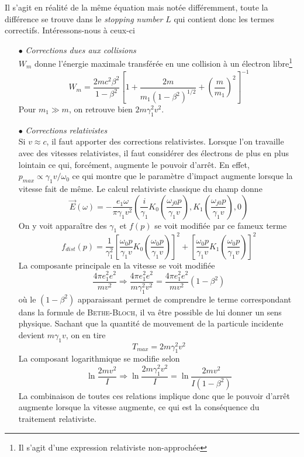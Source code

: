 Il s'agit en réalité de la même équation mais notée différemment, toute la différence se 
trouve dans le \textit{stopping number} $L$ qui contient donc les termes correctifs. 
Intéressons-nous à ceux-ci
\begin{itemize}
\item[$\bullet$] \textit{Corrections dues aux collisions}\ \\
$W_m$ donne l'énergie maximale transférée en une collision à un électron
libre\footnote{Il s'agit d'une expression relativiste non-approchée}
\begin{equation}
W_m=\frac{2mc^2\beta^2}{1-\beta^2}\left[1+\frac{2m}{m_1(1-\beta^2)^{1/2}}+\left(\frac{m}{m_1}\right)^2\right]^{-1}
\end{equation}
Pour $m_1\gg m$, on retrouve bien $2m\gamma_1^2v^2$.
\item[$\bullet$] \textit{Corrections relativistes}\ \\
Si $v\approx c$, il faut apporter des corrections relativistes. Lorsque l'on travaille avec
des vitesses relativistes, il faut considérer des électrons de plus en plus lointain ce qui, 
forcément, augmente le pouvoir d'arrêt. En effet, $p_{max} \propto \gamma_1v/\omega_0$ ce qui
montre que le paramètre d'impact augmente lorsque la vitesse fait de même. Le calcul relativiste
classique du champ donne
\begin{equation}
\overrightarrow{E}(\omega)=-\frac{e_1\omega}{\pi \gamma_1v^2}\left(\frac{i}{\gamma_1}K_0\left(\frac{\omega_{j0}p}{\gamma_1v}\right),K_1\left(\frac{\omega_{j0}p}{\gamma_1v}\right),0\right)
\end{equation}
On y voit apparaître des $\gamma_1$ et $f(p)$ se voit modifiée par ce fameux terme
\begin{equation}
f_{dist}(p)=\frac{1}{\gamma_1^2}\left[\frac{\omega_{0}p}{\gamma_1v}K_0\left(\frac{\omega_{0}p}{\gamma_1v}\right)\right]^2+\left[\frac{\omega_{0}p}{\gamma_1v}K_1\left(\frac{\omega_{0}p}{\gamma_1v}\right)\right]^2
\end{equation}
La composante principale en la vitesse se voit modifiée
\begin{equation}
\frac{4\pi e_1^2e^2}{mv^2}\Rightarrow \frac{4\pi e_1^2e^2}{m\gamma_1^2v^2}=\frac{4\pi e_1^2e^2}{mv^2}(1-\beta^2)
\end{equation}
où le $(1-\beta^2)$ apparaissant permet de comprendre le terme correspondant dans la formule de 
\textsc{Bethe-Bloch}, il va être possible de lui donner un sens physique. Sachant que la quantité 
de mouvement de la particule incidente devient $m\gamma_1v$, on en tire
\begin{equation}
T_{max}=2m\gamma_1^2v^2
\end{equation}
La composant logarithmique se modifie selon
\begin{equation}
\ln{\frac{2mv^2}{I}}\Rightarrow \ln{\frac{2m\gamma_1^2v^2}{I}}=\ln{\frac{2mv^2}{I(1-\beta^2)}}
\end{equation}
La combinaison de toutes ces relations implique donc que le pouvoir d'arrêt augmente lorsque 
la vitesse augmente, ce qui est la conséquence du traitement relativiste. 
\end{itemize}

